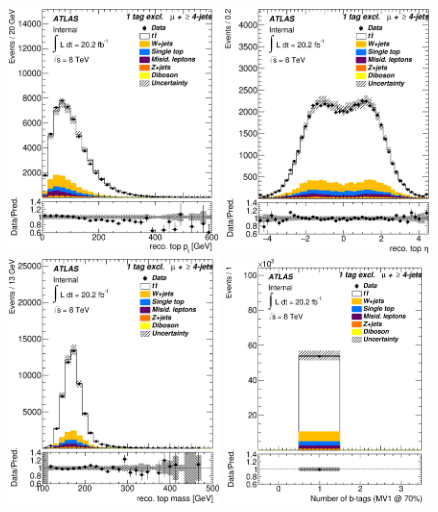 \begin{figure}[!h]
\begin{center}
		\includegraphics[height=65mm]{chapters/whel/figures/control_Plots2/bTag_1excl/reco_Top_pt_mu}
		\includegraphics[height=65mm]{chapters/whel/figures/control_Plots2/bTag_1excl/reco_Top_eta_mu}\\
		\includegraphics[height=65mm]{chapters/whel/figures/control_Plots2/bTag_1excl/reco_Top_m_mu}
		\includegraphics[height=65mm]{chapters/whel/figures/control_Plots2/bTag_1excl/NumberBtags_mu}\\

\end{center}
\end{figure}
